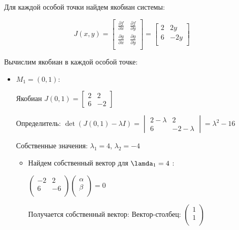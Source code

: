 \documentclass[12pt]{article}
\begin{document}
Для каждой особой точки найдем якобиан системы:


\[
J(x, y) =
\begin{bmatrix}
\frac{{\partial f}}{{\partial x}} & \frac{{\partial f}}{{\partial y}} \\
\frac{{\partial g}}{{\partial x}} & \frac{{\partial g}}{{\partial y}} \\
\end{bmatrix}
=
\begin{bmatrix}
2 & 2y \\
 6 & -2y\\
\end{bmatrix}
\]

Вычислим якобиан в каждой особой точке:


\begin{itemize}
  \item $M_1 = (0, 1)$:
  
  Якобиан $J(0, 1) = \begin{bmatrix} 2 & 2 \\ 6 & -2 \end{bmatrix}$
  
  Определитель: $\det(J(0, 1) - \lambda I) = \begin{vmatrix} 2-\lambda & 2 \\ 6 & -2-\lambda \end{vmatrix} = \lambda^2-16$
  
  Собственные значения: $\lambda_1 = 4$, $\lambda_2 = -4$

\begin{itemize}

\item Найдем собственный вектор для $\lamda_1 = 4$ :

\(
\begin{pmatrix}
-2 & 2 \\
6 & -6 \\
\end{pmatrix}
\begin{pmatrix}
\alpha \\
\beta \\
\end{pmatrix}
= 0
\)
  
Получается собственный вектор:
Вектор-столбец:
\(
\begin{pmatrix}
1 \\
1 \\
\end{pmatrix}
\)


\end{itemize}
\end{itemize}
\end{document}
